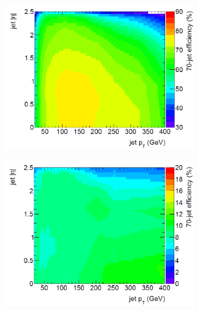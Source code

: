 \begin{figure}[h!]
\begin{subfigure}{0.5\textwidth}
  \centering
  \includegraphics[width=0.9\textwidth]{figures/Objects/Eff_B.png}
  \caption{}
  \label{sec:obj:fig:beff}
\end{subfigure}
\begin{subfigure}{0.5\textwidth}
  \centering
  \includegraphics[width=0.9\textwidth]{figures/Objects/Eff_C.png}
  \caption{}
  \label{sec:obj:fig:ceff}
\end{subfigure}
\begin{center}
\begin{subfigure}{0.5\textwidth}
  \centering

\end{subfigure}
\end{center}
\end{figure}
